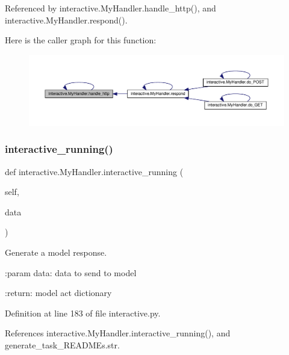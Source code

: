 Referenced by interactive.\+My\+Handler.\+handle\+\_\+http(), and interactive.\+My\+Handler.\+respond().

Here is the caller graph for this function\+:
\nopagebreak
\begin{figure}[H]
\begin{center}
\leavevmode
\includegraphics[width=350pt]{classinteractive_1_1MyHandler_a5941a3caf26e4d5931324edbdbf51f8b_icgraph}
\end{center}
\end{figure}
\mbox{\label{classinteractive_1_1MyHandler_ada828133485ee47cad9bfadf450fc49a}} 
\subsubsection{\texorpdfstring{interactive\+\_\+running()}{interactive\_running()}\hspace{0.1cm}{\footnotesize\ttfamily [1/2]}}
{\footnotesize\ttfamily def interactive.\+My\+Handler.\+interactive\+\_\+running (\begin{DoxyParamCaption}\item[{}]{self,  }\item[{}]{data }\end{DoxyParamCaption})}

\begin{DoxyVerb}Generate a model response.

:param data:
    data to send to model

:return:
    model act dictionary
\end{DoxyVerb}
 

Definition at line 183 of file interactive.\+py.



References interactive.\+My\+Handler.\+interactive\+\_\+running(), and generate\+\_\+task\+\_\+\+R\+E\+A\+D\+M\+Es.\+str.

